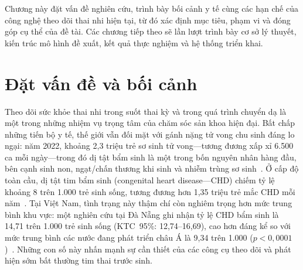 \documentclass[../DoAn.tex]{subfiles}
\begin{document}

Chương này đặt vấn đề nghiên cứu, trình bày bối cảnh y tế cùng các hạn chế của công nghệ theo dõi thai nhi hiện tại, từ đó xác định mục tiêu, phạm vi và đóng góp cụ thể của đề tài. Các chương tiếp theo sẽ lần lượt trình bày cơ sở lý thuyết, kiến trúc mô hình đề xuất, kết quả thực nghiệm và hệ thống triển khai.

\section{Đặt vấn đề và bối cảnh}
\label{section:1.1}

Theo dõi sức khỏe thai nhi trong suốt thai kỳ và trong quá trình chuyển dạ là một trong những nhiệm vụ trọng tâm của chăm sóc sản khoa hiện đại. Bất chấp những tiến bộ y tế, thế giới vẫn đối mặt với gánh nặng tử vong chu sinh đáng lo ngại: năm 2022, khoảng 2,3 triệu trẻ sơ sinh tử vong---tương đương xấp xỉ 6.500 ca mỗi ngày---trong đó dị tật bẩm sinh là một trong bốn nguyên nhân hàng đầu, bên cạnh sinh non, ngạt/chấn thương khi sinh và nhiễm trùng sơ sinh~\cite{un_igme_mortality_2023}. Ở cấp độ toàn cầu, dị tật tim bẩm sinh (congenital heart disease---CHD) chiếm tỷ lệ khoảng 8 trên 1.000 trẻ sinh sống, tương đương hơn 1,35 triệu trẻ mắc CHD mỗi năm~\cite{devriesFetalElectrocardiographyArtificial2023}. Tại Việt Nam, tình trạng này thậm chí còn nghiêm trọng hơn mức trung bình khu vực: một nghiên cứu tại Đà Nẵng ghi nhận tỷ lệ CHD bẩm sinh là 14,71 trên 1.000 trẻ sinh sống (KTC~95\%: 12,74--16,69), cao hơn đáng kể so với mức trung bình các nước đang phát triển châu Á là 9,34 trên 1.000 ($p{<}0{,}0001$)~\cite{giangElevatedCongenitalHeart2022}. Những con số này nhấn mạnh sự cần thiết của các công cụ theo dõi và phát hiện sớm bất thường tim thai trước sinh.
\end{document}
